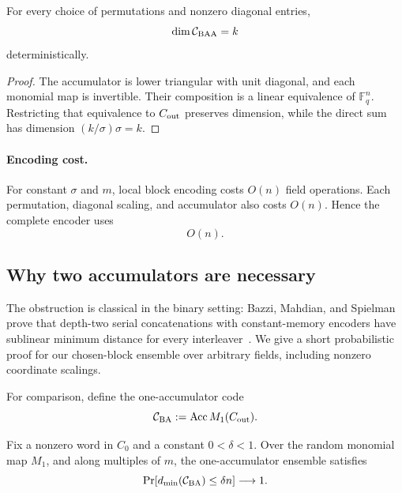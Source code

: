\documentclass[runningheads,envcountsame,envcountsect]{llncs}
\newcommand{\F}{\mathbb F}
\newcommand{\Acc}{\operatorname{Acc}}
\newcommand{\Prb}{\Pr}
\newcommand{\cC}{\mathcal C}
\begin{document}
\begin{proposition}
For every choice of permutations and nonzero diagonal entries,
\[
    \dim \cC_{\rm BAA} = k
\]
deterministically.
\end{proposition}

\begin{proof}
The accumulator is lower triangular with unit diagonal, and each monomial map
is invertible.  Their composition is a linear equivalence of $\F_q^n$.
Restricting that equivalence to $C_{\rm out}$ preserves dimension, while the
direct sum has dimension $(k/\sigma)\sigma=k$.
\end{proof}

\paragraph{Encoding cost.}
For constant $\sigma$ and $m$, local block encoding costs $O(n)$ field operations.
Each permutation, diagonal scaling, and accumulator also costs $O(n)$.
Hence the complete encoder uses
\[
    \boxed{O(n).}
\]

\subsection{Why two accumulators are necessary}

The obstruction is classical in the binary setting: Bazzi, Mahdian, and
Spielman prove that depth-two serial concatenations with constant-memory
encoders have sublinear minimum distance for every
interleaver~\cite[Theorem~3]{bms09}.  We give a short probabilistic proof for
our chosen-block ensemble over arbitrary fields, including nonzero coordinate
scalings.

For comparison, define the one-accumulator code
\[
    \cC_{\rm BA}:=\Acc M_1(C_{\rm out}).
\]

\begin{proposition}
Fix a nonzero word in $C_0$ and a constant $0<\delta<1$.  Over the random
monomial map $M_1$, and along multiples of $m$, the one-accumulator ensemble
satisfies
\[
    \Prb[d_{\min}(\cC_{\rm BA})\le \delta n]\longrightarrow 1.
\]
\end{proposition}
\end{document}
